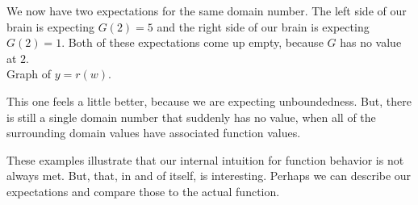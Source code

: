 \documentclass{ximera}
\begin{document}
We now have two expectations for the same domain number. The left side of our brain is expecting $G(2)=5$ and the right side of our brain is expecting $G(2)=1$. Both of these expectations come up empty, because $G$ has no value at $2$. \\







Graph of $y = r(w)$.  

\begin{image}
\end{image}



This one feels a little better, because we are expecting unboundedness.  But, there is still a single domain number that suddenly has no value, when all of the surrounding domain values have associated function values.












These examples illustrate that our internal intuition for function behavior is not always met.  But, that, in and of itself, is interesting.  Perhaps we can describe our expectations and compare those to the actual function.
\end{document}
